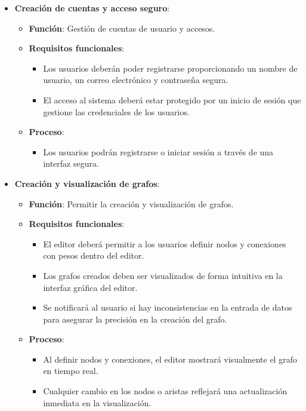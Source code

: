 \documentclass[stu, 12pt, letterpaper, donotrepeattitle, floatsintext, natbib]{apa7}
\begin{document}
\begin{itemize}
    \item \textbf{Creación de cuentas y acceso seguro}:
    \begin{itemize}
    \item \textbf{Función}: Gestión de cuentas de usuario y accesos.
    \item \textbf{Requisitos funcionales}:
        \begin{itemize}
            \item Los usuarios deberán poder registrarse proporcionando un nombre de usuario, un correo electrónico y contraseña segura.
            \item El acceso al sistema deberá estar protegido por un inicio de sesión que gestione las credenciales de los usuarios.
        \end{itemize}
    \item \textbf{Proceso}:
        \begin{itemize}
            \item Los usuarios podrán registrarse o iniciar sesión a través de una interfaz segura.
        \end{itemize}
    \end{itemize}
    \item \textbf{Creación y visualización de grafos}:
    \begin{itemize}
        \item \textbf{Función}: Permitir la creación y visualización de grafos.
        \item \textbf{Requisitos funcionales}:
            \begin{itemize}
                \item El editor deberá permitir a los usuarios definir nodos y conexiones con pesos dentro del editor.
                \item Los grafos creados deben ser visualizados de forma intuitiva en la interfaz gráfica del editor.
                \item Se notificará al usuario si hay inconsistencias en la entrada de datos para asegurar la precisión en la creación del grafo.
            \end{itemize}
        \item \textbf{Proceso}:
            \begin{itemize}
                \item Al definir nodos y conexiones, el editor mostrará visualmente el grafo en tiempo real.
                \item Cualquier cambio en los nodos o aristas reflejará una actualización inmediata en la visualización.
            \end{itemize}
    \end{itemize}


\end{itemize}
\end{document}
